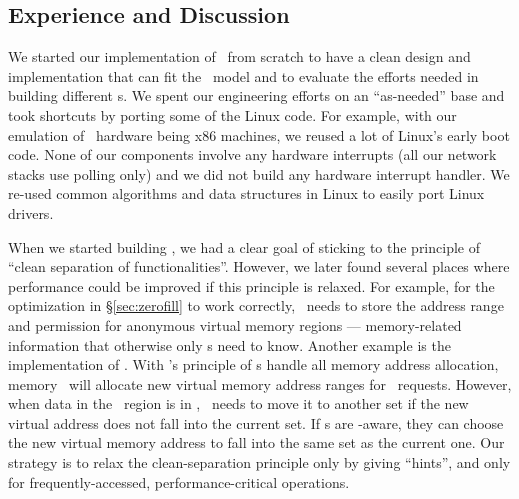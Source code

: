 \documentclass[10pt,times,twocolumn]{z2-article}
\begin{document}
{{{{{{{\subsection{Experience and Discussion}
We started our implementation of \lego\ from scratch to have a clean design and implementation that 
can fit the \splitkernel\ model
and to evaluate the efforts needed in building different \microos{}s.
We spent our engineering efforts on an ``as-needed'' base
and took shortcuts by porting some of the Linux code. 
For example, with our emulation of \lego\ hardware being x86 machines,
we reused a lot of Linux's early boot code. 
None of our components involve any hardware interrupts (all our network stacks use polling only)
and we did not build any hardware interrupt handler.
We re-used common algorithms and data structures in Linux to easily port Linux drivers.


When we started building \lego, we had a clear goal of sticking to
the principle of ``clean separation of functionalities''.
However, we later found several places where performance could be improved 
if this principle is relaxed.
For example, for the optimization in \S\ref{sec:zerofill} to work correctly,
\pcomponent\ needs to store the address range and permission for anonymous virtual memory regions --- 
memory-related information that otherwise only \mcomponent{}s need to know.
Another example is the implementation of \mremap.
With \lego's principle of \mcomponent{}s handle all memory address allocation,
memory \microos\ will allocate new virtual memory address ranges for \mremap\ requests.
However, when data in the \mremap\ region is in \excache, 
\lego\ needs to move it to another set if the new virtual address does not fall into the 
current set.
If \mcomponent{}s are \excache-aware, they can choose the new virtual memory address
to fall into the same set as the current one.
Our strategy is to relax the clean-separation principle only by giving ``hints'', 
and only for frequently-accessed,
performance-critical operations.
%


%
}}}}}}}
\end{document}

